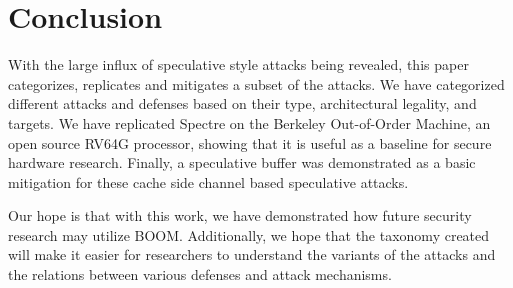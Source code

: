\section{Conclusion}

With the large influx of speculative style attacks being revealed, this paper categorizes,
replicates and mitigates a subset of the attacks. We have categorized different attacks 
and defenses based on their type, architectural legality, and targets. We have replicated 
Spectre on the Berkeley Out-of-Order Machine, an open source RV64G processor, showing that it
is useful as a baseline for secure hardware research. Finally, a speculative buffer was demonstrated
as a basic mitigation for these cache side channel based speculative attacks.

Our hope is that with this work, we have demonstrated how future security research may utilize BOOM.
Additionally, we hope that the taxonomy created will make it easier for researchers to understand
the variants of the attacks and the relations between various defenses and attack mechanisms.
